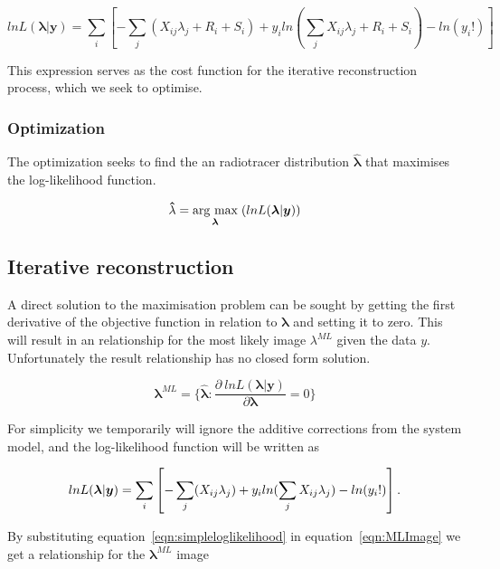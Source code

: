 \begin{equation}
    lnL(\bm{\lambda}|\bm{y})  = \sum_i\left[  -\sum_j (X_{ij} \lambda_j + R_i + S_i) + y_i ln(\sum_j X_{ij} \lambda_j + R_i + S_i) - ln({y_i}!) \right]
\end{equation}

This expression serves as the cost function for the iterative reconstruction process, which we seek to optimise. 


\subsubsection{Optimization}

The optimization seeks to find the an radiotracer distribution $\bm\hat\lambda$  that maximises the log-likelihood function. 

\begin{equation}
\bm\hat\lambda = \underset{\bm{\lambda}}{\operatorname{arg}\,\operatorname{max}}\;(lnL(\bm{\lambda}|\bm{y}))
\end{equation}

\subsection{Iterative reconstruction}

A direct solution to the maximisation problem can be sought by getting the first derivative of the objective function in relation to $\bm{\lambda}$ and setting it to zero. This will result in an relationship for the most likely image $\lambda^{ML}$ given the data $y$. Unfortunately the result relationship has no closed form solution. 

\begin{equation}
\bm\lambda^{ML} = \Bigg\{ \bm{\hat{\lambda}}:  \frac{\partial \ lnL(\bm{\lambda}|\bm{y})}{\partial \bm\lambda} = 0 \Bigg\}
\label{eqn:MLImage}
\end{equation}

For simplicity we temporarily will ignore the additive corrections from the system model, and the log-likelihood function will be written as

\begin{equation}
    lnL(\bm{\lambda}|\bm{y})  = \sum_i\left[  -\sum_j (X_{ij} \lambda_j) + y_i ln(\sum_j X_{ij} \lambda_j) - ln({y_i}!) \right] \\.
    \label{eqn:simpleloglikelihood}
\end{equation}

By substituting equation~\ref{eqn:simpleloglikelihood} in equation~\ref{eqn:MLImage} we get a relationship for the $\bm\lambda^{ML}$ image










